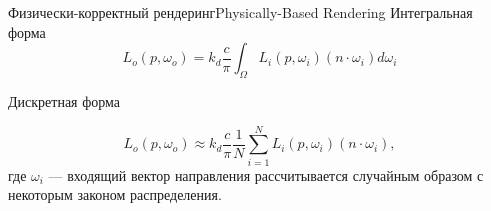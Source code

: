 \documentclass{beamer}
\begin{document}
	\begin{frame}{Физически-корректный рендеринг}{Physically-Based Rendering}
		Интегральная форма
		\[
			L_o(p,\omega_o) = k_d \frac{c}{\pi}
			\int_{\Omega}
			L_i(p, \omega_i) (n \cdot \omega_i) d \omega_i
		\]

		Дискретная форма

		\[
			L_o(p,\omega_o) \approx k_d \frac{c}{\pi} \frac{1}{N}
			\sum_{i = 1}^{N}
			L_i(p, \omega_i) (n \cdot \omega_i) %
		,
		\]
		где 
		$\omega_i$ --- входящий вектор направления рассчитывается случайным образом с некоторым законом распределения.


	\end{frame}
\end{document}
